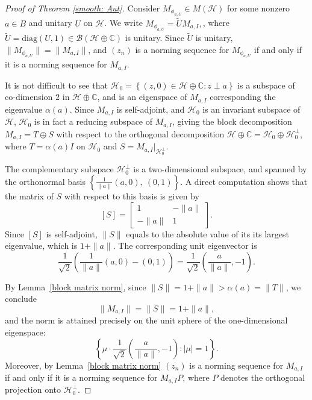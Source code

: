 \documentclass[12pt]{amsart}
\theoremstyle{definition}
\renewcommand{\H}{\mathcal{H}}
\begin{document}
\begin{proof}[Proof of Theorem \ref{smooth: Aut}]
Consider $M_{\phi_{a,U}} \in M(\mathcal{H})$ for some nonzero 
$a \in B$ and unitary $U$ on $\mathcal{H}$. We write $M_{\phi_{a,U}} = \widetilde{U}M_{a,I},$, where $\widetilde{U} = \mathrm{diag}(U, 1) \in \mathcal{B}(\mathcal{H} \oplus \mathbb{C})$ is unitary. Since $\widetilde{U}$ is unitary, $\|M_{\phi_{a,U}}\| = \|M_{a,I}\|$, and 
$(z_n)$ is a norming sequence for $M_{\phi_{a,U}}$ if and only if it is 
a norming sequence for $M_{a,I}$. 

\medskip

\noindent It is not difficult to see that $\mathcal{H}_0 = \left\{(z, 0) \in \mathcal{H} \oplus \mathbb{C} : z \perp a\right\}$ is a subspace of co-dimension $2$ in $\mathcal{H} \oplus \mathbb{C}$, and is an eigenspace of $M_{a,I}$ corresponding the eigenvalue $\alpha(a)$. Since $M_{a,I}$ 
is self-adjoint, and $\H_0$ is an invariant subspace of $\H$, $\mathcal{H}_0$ is in fact 
a reducing subspace of $M_{a,I}$, giving the block decomposition $M_{a,I} = T\oplus S$ with respect to the orthogonal decomposition $\mathcal{H} \oplus \mathbb{C} = \mathcal{H}_0 \oplus \mathcal{H}_0^\perp$, where $T = \alpha(a)I$ 
on $\mathcal{H}_0$ and $S = M_{a,I}|_{\mathcal{H}_0^\perp}$. 


\medskip

\noindent The complementary subspace $\mathcal{H}_0^\perp$ is 
a two-dimensional subspace, and spanned by the orthonormal basis 
$\left\{\frac{1}{\|a\|}(a, 0),\ (0,1)\right\}$. A direct computation shows that the matrix of $S$ with respect to this basis is given by
\[
[S] = \begin{bmatrix} 1 & -\|a\| \\ -\|a\| & 1 \end{bmatrix}.
\]
Since $[S]$ is self-adjoint, $\|S\|$ equals to the absolute value of its its largest eigenvalue, which is $1 + \|a\|$. The corresponding unit
eigenvector is 
\[
\frac{1}{\sqrt{2}}\left(\frac{1}{\|a\|}(a,0) - 
(0,1)\right) = \frac{1}{\sqrt{2}}\left(\frac{a}{\|a\|}, -1\right).
\]

\medskip

\noindent By Lemma~\ref{block matrix norm}, since 
$\|S\| = 1 + \|a\| > \alpha(a) = \|T\|$, we conclude
\[
\|M_{a,I}\| = \|S\| = 1 + \|a\|,
\]
and the norm is attained precisely on the unit sphere of the one-dimensional eigenspace:
\[
\left\{\mu\cdot\frac{1}{\sqrt{2}}
\left(\frac{a}{\|a\|}, -1\right) : |\mu| = 1\right\}.
\]
Moreover, by Lemma~\ref{block matrix norm} $(z_n)$ is a 
norming sequence for $M_{a,I}$ if and only if it is a norming 
sequence for $M_{a,I}P$, where $P$ denotes the orthogonal projection 
onto $\mathcal{H}_0^\perp$.




\end{proof}
\end{document}
